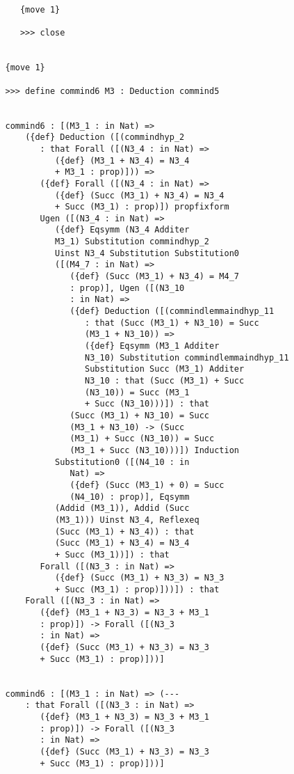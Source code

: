 \documentclass[12pt]{article}
\begin{document}
\begin{verbatim}
      {move 1}

      >>> close


   {move 1}

   >>> define commind6 M3 : Deduction commind5


   commind6 : [(M3_1 : in Nat) => 
       ({def} Deduction ([(commindhyp_2 
          : that Forall ([(N3_4 : in Nat) => 
             ({def} (M3_1 + N3_4) = N3_4 
             + M3_1 : prop)])) => 
          ({def} Forall ([(N3_4 : in Nat) => 
             ({def} (Succ (M3_1) + N3_4) = N3_4 
             + Succ (M3_1) : prop)]) propfixform 
          Ugen ([(N3_4 : in Nat) => 
             ({def} Eqsymm (N3_4 Additer 
             M3_1) Substitution commindhyp_2 
             Uinst N3_4 Substitution Substitution0 
             ([(M4_7 : in Nat) => 
                ({def} (Succ (M3_1) + N3_4) = M4_7 
                : prop)], Ugen ([(N3_10 
                : in Nat) => 
                ({def} Deduction ([(commindlemmaindhyp_11 
                   : that (Succ (M3_1) + N3_10) = Succ 
                   (M3_1 + N3_10)) => 
                   ({def} Eqsymm (M3_1 Additer 
                   N3_10) Substitution commindlemmaindhyp_11 
                   Substitution Succ (M3_1) Additer 
                   N3_10 : that (Succ (M3_1) + Succ 
                   (N3_10)) = Succ (M3_1 
                   + Succ (N3_10)))]) : that 
                (Succ (M3_1) + N3_10) = Succ 
                (M3_1 + N3_10) -> (Succ 
                (M3_1) + Succ (N3_10)) = Succ 
                (M3_1 + Succ (N3_10)))]) Induction 
             Substitution0 ([(N4_10 : in 
                Nat) => 
                ({def} (Succ (M3_1) + 0) = Succ 
                (N4_10) : prop)], Eqsymm 
             (Addid (M3_1)), Addid (Succ 
             (M3_1))) Uinst N3_4, Reflexeq 
             (Succ (M3_1) + N3_4)) : that 
             (Succ (M3_1) + N3_4) = N3_4 
             + Succ (M3_1))]) : that 
          Forall ([(N3_3 : in Nat) => 
             ({def} (Succ (M3_1) + N3_3) = N3_3 
             + Succ (M3_1) : prop)]))]) : that 
       Forall ([(N3_3 : in Nat) => 
          ({def} (M3_1 + N3_3) = N3_3 + M3_1 
          : prop)]) -> Forall ([(N3_3 
          : in Nat) => 
          ({def} (Succ (M3_1) + N3_3) = N3_3 
          + Succ (M3_1) : prop)]))]


   commind6 : [(M3_1 : in Nat) => (--- 
       : that Forall ([(N3_3 : in Nat) => 
          ({def} (M3_1 + N3_3) = N3_3 + M3_1 
          : prop)]) -> Forall ([(N3_3 
          : in Nat) => 
          ({def} (Succ (M3_1) + N3_3) = N3_3 
          + Succ (M3_1) : prop)]))]



\end{verbatim}
\end{document}
